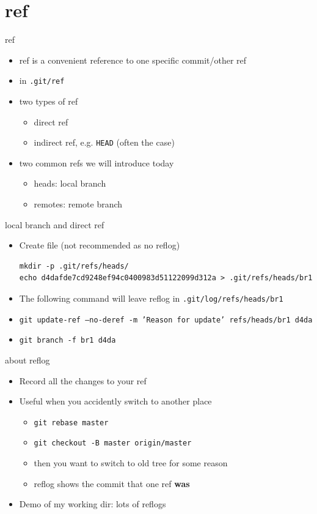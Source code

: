 \documentclass[aspectratio=169]{beamer}
\newcommand{\T}[1]{\texttt{#1}}
\begin{document}
\section{ref}
\begin{frame}{ref}
  \begin{itemize}
    \item ref is a convenient reference to one specific commit/other ref
    \item in \T{.git/ref}
    \item two types of ref\begin{itemize}
      \item direct ref
      \item indirect ref, e.g. \T{HEAD} (often the case)
    \end{itemize}
    \item two common refs we will introduce today\begin{itemize}
      \item heads: local branch
      \item remotes: remote branch
    \end{itemize}
  \end{itemize}
\end{frame}

\begin{frame}[fragile]{local branch and direct ref}
  \begin{itemize}
    \item<1-> Create file (not recommended as no reflog)\begin{verbatim}
mkdir -p .git/refs/heads/
echo d4dafde7cd9248ef94c0400983d51122099d312a > .git/refs/heads/br1
\end{verbatim}
    \item<2-> The following command will leave reflog in \T{.git/log/refs/heads/br1}
    \item<2-> \T{git update-ref --no-deref -m 'Reason for update' refs/heads/br1 d4da}
    \item<2-> \T{git branch -f br1 d4da}
  \end{itemize}
\end{frame}

\begin{frame}{about reflog}
  \begin{itemize}
    \item Record all the changes to your ref
    \item Useful when you accidently switch to another place\begin{itemize}
      \item \T{git rebase master}
      \item \T{git checkout -B master origin/master}
      \item then you want to switch to old tree for some reason
      \item reflog shows the commit that one ref \textbf{was}
    \end{itemize}
    \item Demo of my working dir: lots of reflogs
  \end{itemize}
\end{frame}
\end{document}
